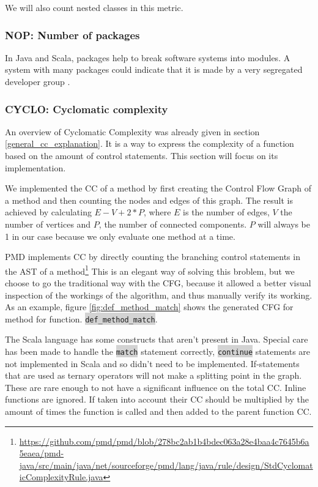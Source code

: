 \documentclass[onecolumn]{article}
\newcommand{\code}[1]{\colorbox{lightgray}{\texttt{#1}}}
\begin{document}
We will also count nested classes in this metric.


\subsubsection{NOP: Number of packages} \label{overview_pyramid_NOP}
In Java and Scala, packages help to break software systems into modules. A system with many packages could indicate that it is made by a very segregated developer group \cite{schroter2006if}.


\subsubsection{CYCLO: Cyclomatic complexity} \label{overview_pyramid_CC}
An overview of Cyclomatic Complexity was already given in section \ref{general_cc_explanation}. It is a way to express the complexity of a function based on the amount of control statements. This section will focus on its implementation.

We implemented the CC of a method by first creating the Control Flow Graph of a method and then counting the nodes and edges of this graph. The result is achieved by calculating $E - V + 2 * P$, where $E$ is the number of edges, $V$ the number of vertices and $P$, the number of connected components. $P$ will always be 1 in our case because we only evaluate one method at a time.

PMD implements CC by directly counting the branching control statements in the AST of a method\footnote{\url{https://github.com/pmd/pmd/blob/278bc2ab1b4bdec063a28e4baa4c7645b6a5eaea/pmd-java/src/main/java/net/sourceforge/pmd/lang/java/rule/design/StdCyclomaticComplexityRule.java}} This is an elegant way of solving this broblem, but we choose to go the traditional way with the CFG, because it allowed a better visual inspection of the workings of the algorithm, and thus manually verify its working. As an example, figure \ref{fig:def_method_match} shows the generated CFG for method for function. \code{def\_method\_match}.

The Scala language has some constructs that aren't present in Java. Special care has been made to handle the \code{match} statement correctly, \code{continue} statements are not implemented in Scala and so didn't need to be implemented. If-statements that are used as ternary operators will not make a splitting point in the graph. These are rare enough to not have a significant influence on the total CC. Inline functions are ignored. If taken into account their CC should be multiplied by the amount of times the function is called and then added to the parent function CC. 
\end{document}
